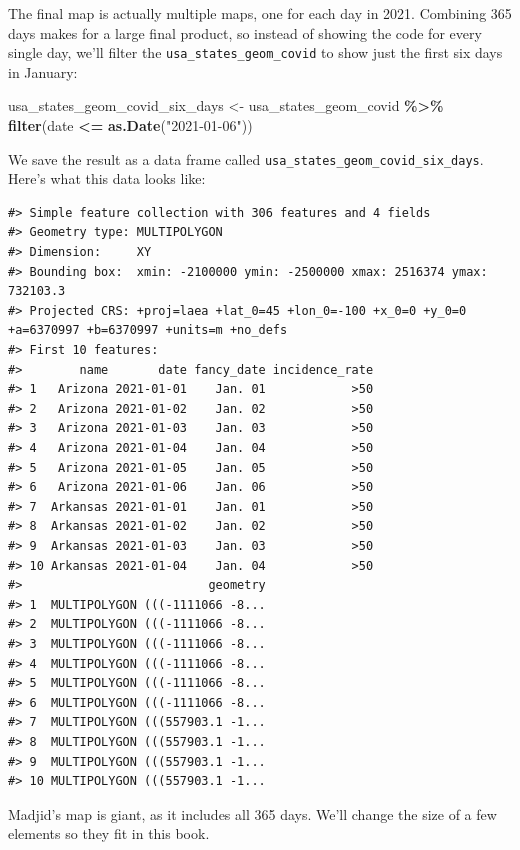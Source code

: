 \documentclass[
]{book}
\newenvironment{Shaded}{\begin{snugshade}}{\end{snugshade}}
\newcommand{\FunctionTok}[1]{\textcolor[rgb]{0.13,0.29,0.53}{\textbf{#1}}}
\newcommand{\NormalTok}[1]{#1}
\newcommand{\OtherTok}[1]{\textcolor[rgb]{0.56,0.35,0.01}{#1}}
\newcommand{\SpecialCharTok}[1]{\textcolor[rgb]{0.81,0.36,0.00}{\textbf{#1}}}
\newcommand{\StringTok}[1]{\textcolor[rgb]{0.31,0.60,0.02}{#1}}
\begin{document}
The final map is actually multiple maps, one for each day in 2021. Combining 365 days makes for a large final product, so instead of showing the code for every single day, we'll filter the \texttt{usa\_states\_geom\_covid} to show just the first six days in January:

\begin{Shaded}
\begin{Highlighting}[]
\NormalTok{usa\_states\_geom\_covid\_six\_days }\OtherTok{\textless{}{-}}\NormalTok{ usa\_states\_geom\_covid }\SpecialCharTok{\%\textgreater{}\%}
  \FunctionTok{filter}\NormalTok{(date }\SpecialCharTok{\textless{}=} \FunctionTok{as.Date}\NormalTok{(}\StringTok{"2021{-}01{-}06"}\NormalTok{))}
\end{Highlighting}
\end{Shaded}

We save the result as a data frame called \texttt{usa\_states\_geom\_covid\_six\_days}. Here's what this data looks like:

\begin{verbatim}
#> Simple feature collection with 306 features and 4 fields
#> Geometry type: MULTIPOLYGON
#> Dimension:     XY
#> Bounding box:  xmin: -2100000 ymin: -2500000 xmax: 2516374 ymax: 732103.3
#> Projected CRS: +proj=laea +lat_0=45 +lon_0=-100 +x_0=0 +y_0=0 +a=6370997 +b=6370997 +units=m +no_defs
#> First 10 features:
#>        name       date fancy_date incidence_rate
#> 1   Arizona 2021-01-01    Jan. 01            >50
#> 2   Arizona 2021-01-02    Jan. 02            >50
#> 3   Arizona 2021-01-03    Jan. 03            >50
#> 4   Arizona 2021-01-04    Jan. 04            >50
#> 5   Arizona 2021-01-05    Jan. 05            >50
#> 6   Arizona 2021-01-06    Jan. 06            >50
#> 7  Arkansas 2021-01-01    Jan. 01            >50
#> 8  Arkansas 2021-01-02    Jan. 02            >50
#> 9  Arkansas 2021-01-03    Jan. 03            >50
#> 10 Arkansas 2021-01-04    Jan. 04            >50
#>                          geometry
#> 1  MULTIPOLYGON (((-1111066 -8...
#> 2  MULTIPOLYGON (((-1111066 -8...
#> 3  MULTIPOLYGON (((-1111066 -8...
#> 4  MULTIPOLYGON (((-1111066 -8...
#> 5  MULTIPOLYGON (((-1111066 -8...
#> 6  MULTIPOLYGON (((-1111066 -8...
#> 7  MULTIPOLYGON (((557903.1 -1...
#> 8  MULTIPOLYGON (((557903.1 -1...
#> 9  MULTIPOLYGON (((557903.1 -1...
#> 10 MULTIPOLYGON (((557903.1 -1...
\end{verbatim}

Madjid's map is giant, as it includes all 365 days. We'll change the size of a few elements so they fit in this book.
\end{document}
